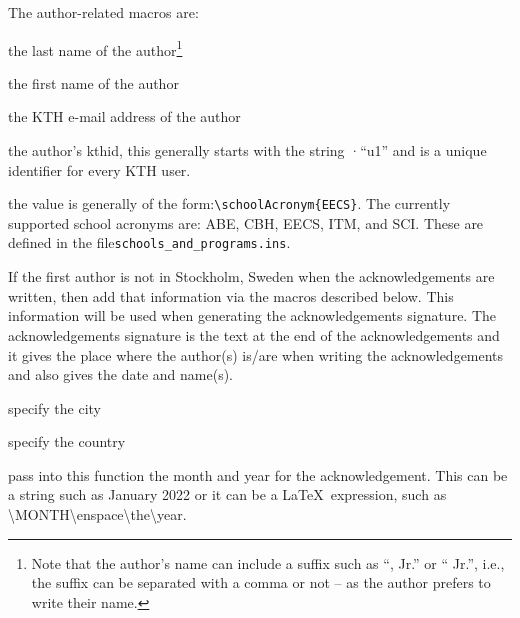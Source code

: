 \documentclass[main.tex]{subfiles}
\begin{document}
The author-related macros are:
\begin{description}[leftmargin=!, labelwidth =\widthof{\texttt{\textbackslash secondAuthorsFirstname\{\}}}]
\item [\texttt{\textbackslash authorsLastname\{\}}] the last name of the author\footnote{Note that the author's name can include a suffix such as ``, Jr.'' or `` Jr.'', i.e., the suffix can be separated with a comma or not -- as the author prefers to write their name.}

\item [\texttt{\textbackslash authorsFirstname\{\}}] the first name of the author

\item [\texttt{\textbackslash email\{\}}] the KTH e-mail address of the author

\item [\texttt{\textbackslash kthid\{\}}] the author's kthid, this generally starts with the string ·``u1'' and is a unique identifier for every KTH user.

\item [\texttt{\textbackslash authorsSchool\{\}}] the value is generally of the form:\linebreak[4] \texttt{\textbackslash schoolAcronym\{EECS\}}. The currently supported school acronyms are: ABE, CBH, EECS, ITM, and SCI. These are defined in the file\linebreak[4] \texttt{schools\_and\_programs.ins}.
\end{description}

If the first author is not in Stockholm, Sweden when the acknowledgements are written, then add that information via the macros described below.
This information will be used when generating the acknowledgements signature. The acknowledgements signature is the text at the end of the acknowledgements and it gives the place where the author(s) is/are when writing the acknowledgements and also gives the date and name(s).
\begin{description}[leftmargin=!, labelwidth =\widthof{\texttt{\textbackslash secondAuthorsFirstname\{\}}}]
\item [\texttt{\textbackslash authorCity\{A City\}}] specify the city

\item [\texttt{\textbackslash authorCountry\{A Country\}}] specify the country

\item [\texttt{\textbackslash authorCityCountryDate\{\}}] pass into this function the month and year for the acknowledgement. This can be a string such as January 2022 or it can be a \LaTeX\  expression, such as \textbackslash MONTH\textbackslash enspace\textbackslash the\textbackslash year.
\end{description}
\end{document}
